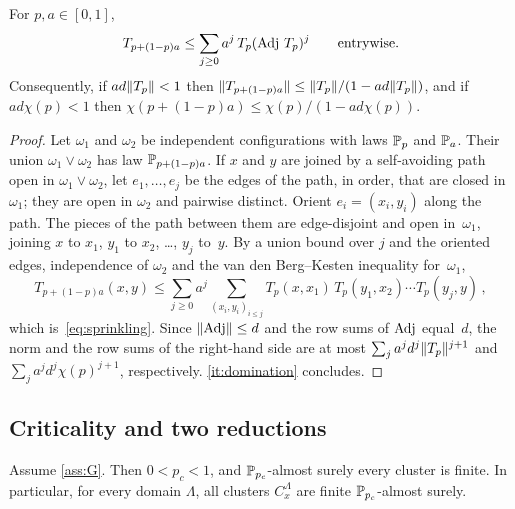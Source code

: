 \begin{lemma}\label{lem:sprinkling}
For $p,a\in[0,1]$,
\begin{equation}\label{eq:sprinkling}
  T_{p+(1-p)a}\le\sum_{j\ge0}a^j\,T_p(\operatorname{Adj}\,T_p)^j\qquad\text{entrywise.}
\end{equation}
Consequently, if $ad\lVert T_p\rVert<1$ then $\lVert T_{p+(1-p)a}\rVert\le\lVert T_p\rVert/(1-ad\lVert T_p\rVert)$, and if
$ad\chi(p)<1$ then $\chi(p+(1-p)a)\le\chi(p)/(1-ad\chi(p))$.
\end{lemma}

\begin{proof}
Let $\omega_1$ and $\omega_2$ be independent configurations with laws $\mathbb P_p$ and $\mathbb P_a$. Their union
$\omega_1\vee\omega_2$ has law $\mathbb P_{p+(1-p)a}$. If $x$ and $y$ are joined by a self-avoiding path open
in $\omega_1\vee\omega_2$, let $e_1,\dots,e_j$ be the edges of the path, in order, that are closed
in~$\omega_1$; they are open in $\omega_2$ and pairwise distinct. Orient $e_i=(x_i,y_i)$ along the path.
The pieces of the path between them are edge-disjoint and open in~$\omega_1$, joining $x$ to $x_1$,
$y_1$ to $x_2$, \dots, $y_j$ to~$y$. By a union bound over $j$ and the oriented edges, independence of
$\omega_2$ and the van den Berg--Kesten inequality for~$\omega_1$,
\begin{equation*}
  T_{p+(1-p)a}(x,y)\le\sum_{j\ge0}a^j\sum_{(x_i,y_i)_{i\le j}}T_p(x,x_1)\,T_p(y_1,x_2)\cdots T_p(y_j,y)\,,
\end{equation*}
which is~\eqref{eq:sprinkling}. Since $\lVert\operatorname{Adj}\rVert\le d$ and the row sums of $\operatorname{Adj}$ equal~$d$, the
norm and the row sums of the right-hand side are at most $\sum_ja^jd^j\lVert T_p\rVert^{j+1}$ and
$\sum_ja^jd^j\chi(p)^{j+1}$, respectively. \ref{it:domination} concludes.
\end{proof}

\subsection{Criticality and two reductions}\label{sec:criticality}

\begin{lemma}\label{lem:pc}
Assume \cref{ass:G}. Then $0<p_c<1$, and $\mathbb P_{p_c}$-almost surely every cluster is finite. In
particular, for every domain $\Lambda$, all clusters $C^\Lambda_x$ are finite $\mathbb P_{p_c}$-almost surely.
\end{lemma}

